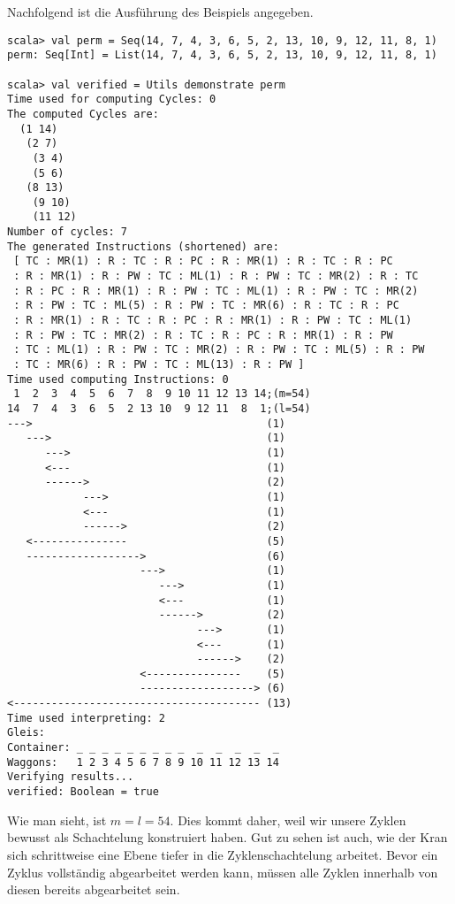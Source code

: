 Nachfolgend ist die Ausführung des Beispiels angegeben.
\begin{lstlisting}
scala> val perm = Seq(14, 7, 4, 3, 6, 5, 2, 13, 10, 9, 12, 11, 8, 1)
perm: Seq[Int] = List(14, 7, 4, 3, 6, 5, 2, 13, 10, 9, 12, 11, 8, 1)

scala> val verified = Utils demonstrate perm                        
Time used for computing Cycles: 0
The computed Cycles are: 
  (1 14)
   (2 7)
    (3 4)
    (5 6)
   (8 13)
    (9 10)
    (11 12)
Number of cycles: 7
The generated Instructions (shortened) are: 
 [ TC : MR(1) : R : TC : R : PC : R : MR(1) : R : TC : R : PC
 : R : MR(1) : R : PW : TC : ML(1) : R : PW : TC : MR(2) : R : TC
 : R : PC : R : MR(1) : R : PW : TC : ML(1) : R : PW : TC : MR(2)
 : R : PW : TC : ML(5) : R : PW : TC : MR(6) : R : TC : R : PC
 : R : MR(1) : R : TC : R : PC : R : MR(1) : R : PW : TC : ML(1)
 : R : PW : TC : MR(2) : R : TC : R : PC : R : MR(1) : R : PW
 : TC : ML(1) : R : PW : TC : MR(2) : R : PW : TC : ML(5) : R : PW
 : TC : MR(6) : R : PW : TC : ML(13) : R : PW ] 
Time used computing Instructions: 0
 1  2  3  4  5  6  7  8  9 10 11 12 13 14;(m=54)
14  7  4  3  6  5  2 13 10  9 12 11  8  1;(l=54)
--->                                     (1)
   --->                                  (1)
      --->                               (1)
      <---                               (1)
      ------>                            (2)
            --->                         (1)
            <---                         (1)
            ------>                      (2)
   <---------------                      (5)
   ------------------>                   (6)
                     --->                (1)
                        --->             (1)
                        <---             (1)
                        ------>          (2)
                              --->       (1)
                              <---       (1)
                              ------>    (2)
                     <---------------    (5)
                     ------------------> (6)
<--------------------------------------- (13)
Time used interpreting: 2
Gleis: 
Container: _ _ _ _ _ _ _ _ _  _  _  _  _  _
Waggons:   1 2 3 4 5 6 7 8 9 10 11 12 13 14
Verifying results...
verified: Boolean = true
\end{lstlisting}

Wie man sieht, ist $m = l = 54$. Dies kommt daher, weil wir unsere Zyklen bewusst als Schachtelung konstruiert haben.
Gut zu sehen ist auch, wie der Kran sich schrittweise eine Ebene tiefer in die Zyklenschachtelung arbeitet.
Bevor ein Zyklus vollständig abgearbeitet werden kann, müssen alle Zyklen innerhalb von diesen bereits abgearbeitet sein.


